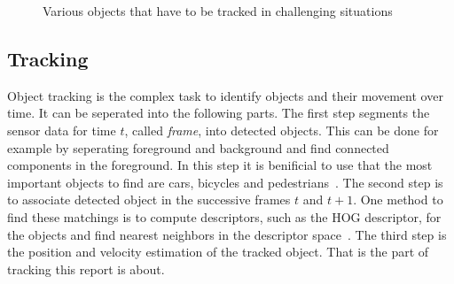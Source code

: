 \documentclass[twoside,a4paper,article]{combine}
\begin{document}
\begin{figure}
  \label{fig:objects}
  
  \caption{Various objects that have to be tracked in challenging
    situations~\cite{held-website}}
\end{figure}


\subsection{Tracking}
\label{sub:tracking}
Object tracking is the complex task to identify objects and their
movement over time. It can be seperated into the following parts. The
first step segments the sensor data for time $t$, called
\textit{frame}, into detected objects. This can be done for example by
seperating foreground and background and find connected components in
the foreground. In this step it is benificial to use that
the most important objects to find are cars, bicycles and
pedestrians~\cite{segmentation}. The second step is to associate
detected object in the successive frames $t$ and $t+1$. One method to
find these matchings is to compute descriptors, such as the HOG
descriptor, for the objects and find nearest neighbors in the
descriptor space~\cite{arbitrary-object-recognition}. The third step
is the position and velocity estimation of the tracked object. That is
the part of tracking this report is about.
\end{document}
